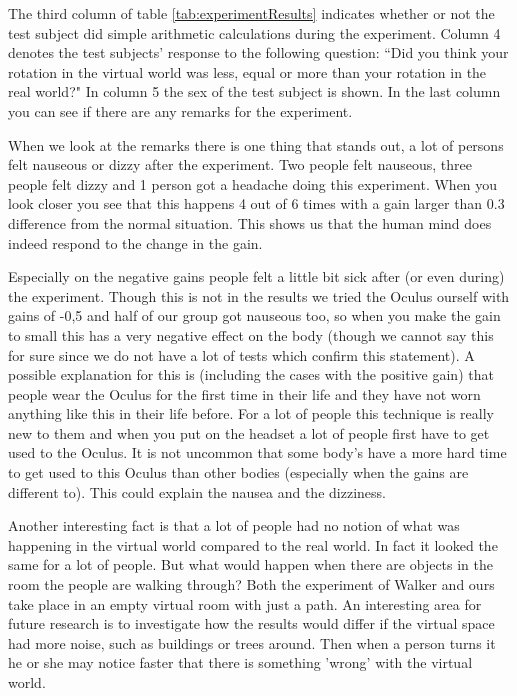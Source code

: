 The third column of table \ref{tab:experimentResults} indicates whether or not the test subject did simple arithmetic calculations during the experiment. 
Column 4 denotes the test subjects'  response to the following question: ``Did you think your rotation in the virtual world was less, equal or more than your rotation in the real world?"
In column 5 the sex of the test subject is shown.%
In the last column you can see if there are any remarks for the experiment.

When we look at the remarks there is one thing that stands out, a lot of persons felt nauseous or dizzy after the experiment. 
Two people felt nauseous, three people felt dizzy and 1 person got a headache doing this experiment. 
When you look closer you see that this happens 4 out of 6 times with a gain larger than 0.3 difference from the normal situation. 
This shows us that the human mind does indeed respond to the change in the gain. 

Especially on the negative gains people felt a little bit sick after (or even during) the experiment. 
Though this is not in the results we tried the Oculus ourself with gains of -0,5 and half of our group got nauseous too, so when you make the gain to small this has a very negative effect on the body (though we cannot say this for sure since we do not have a lot of tests which confirm this statement). 
A possible explanation for this is (including the cases with the positive gain) that people wear the Oculus for the first time in their life and they have not worn anything like this in their life before. 
For a lot of people this technique is really new to them and when you put on the headset a lot of people first have to get used to the Oculus. 
It is not uncommon that some body's have a more hard time to get used to this Oculus than other bodies (especially when the gains are different to). 
This could explain the nausea and the dizziness.


Another interesting fact is that a lot of people had no notion of what was happening in the virtual world compared to the real world.
In fact it looked the same for a lot of people. But what would happen when there are objects in the room the people are walking through? 
Both the experiment of Walker \cite{jwalker} and ours take place in an empty virtual room with just a path. 
An interesting area for future research is to investigate how the results would differ if the virtual space had more noise, such as buildings or trees around.
Then when a person turns it he or she may notice faster that there is something 'wrong'  with the virtual world. 

